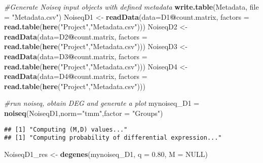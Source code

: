 \documentclass[]{article}
\newenvironment{Shaded}{\begin{snugshade}}{\end{snugshade}}
\newcommand{\CommentTok}[1]{\textcolor[rgb]{0.56,0.35,0.01}{\textit{#1}}}
\newcommand{\DataTypeTok}[1]{\textcolor[rgb]{0.13,0.29,0.53}{#1}}
\newcommand{\FloatTok}[1]{\textcolor[rgb]{0.00,0.00,0.81}{#1}}
\newcommand{\KeywordTok}[1]{\textcolor[rgb]{0.13,0.29,0.53}{\textbf{#1}}}
\newcommand{\NormalTok}[1]{#1}
\newcommand{\OperatorTok}[1]{\textcolor[rgb]{0.81,0.36,0.00}{\textbf{#1}}}
\newcommand{\OtherTok}[1]{\textcolor[rgb]{0.56,0.35,0.01}{#1}}
\newcommand{\StringTok}[1]{\textcolor[rgb]{0.31,0.60,0.02}{#1}}
\begin{document}
\begin{Shaded}
\begin{Highlighting}[]
\CommentTok{#Generate Noiseq input objects with defined metadata}
\KeywordTok{write.table}\NormalTok{(Metadata, }\DataTypeTok{file =} \StringTok{"Metadata.csv"}\NormalTok{)}
\NormalTok{NoiseqD1 <-}\StringTok{ }\KeywordTok{readData}\NormalTok{(}\DataTypeTok{data=}\NormalTok{D1}\OperatorTok{@}\NormalTok{count.matrix, }\DataTypeTok{factors =} \KeywordTok{read.table}\NormalTok{(}\KeywordTok{here}\NormalTok{(}\StringTok{"Project"}\NormalTok{,}\StringTok{"Metadata.csv"}\NormalTok{)))}
\NormalTok{NoiseqD2 <-}\StringTok{ }\KeywordTok{readData}\NormalTok{(}\DataTypeTok{data=}\NormalTok{D2}\OperatorTok{@}\NormalTok{count.matrix, }\DataTypeTok{factors =} \KeywordTok{read.table}\NormalTok{(}\KeywordTok{here}\NormalTok{(}\StringTok{"Project"}\NormalTok{,}\StringTok{"Metadata.csv"}\NormalTok{)))}
\NormalTok{NoiseqD3 <-}\StringTok{ }\KeywordTok{readData}\NormalTok{(}\DataTypeTok{data=}\NormalTok{D3}\OperatorTok{@}\NormalTok{count.matrix, }\DataTypeTok{factors =} \KeywordTok{read.table}\NormalTok{(}\KeywordTok{here}\NormalTok{(}\StringTok{"Project"}\NormalTok{,}\StringTok{"Metadata.csv"}\NormalTok{)))}
\NormalTok{NoiseqD4 <-}\StringTok{ }\KeywordTok{readData}\NormalTok{(}\DataTypeTok{data=}\NormalTok{D4}\OperatorTok{@}\NormalTok{count.matrix, }\DataTypeTok{factors =} \KeywordTok{read.table}\NormalTok{(}\KeywordTok{here}\NormalTok{(}\StringTok{"Project"}\NormalTok{,}\StringTok{"Metadata.csv"}\NormalTok{)))}

\CommentTok{#run noiseq, obtain DEG and generate a plot }
\NormalTok{mynoiseq_D1 =}\StringTok{ }\KeywordTok{noiseq}\NormalTok{(NoiseqD1,}\DataTypeTok{norm=}\StringTok{"tmm"}\NormalTok{,}\DataTypeTok{factor =} \StringTok{"Groups"}\NormalTok{)}
\end{Highlighting}
\end{Shaded}

\begin{verbatim}
## [1] "Computing (M,D) values..."
## [1] "Computing probability of differential expression..."
\end{verbatim}

\begin{Shaded}
\begin{Highlighting}[]
\NormalTok{NoiseqD1_res <-}\StringTok{ }\KeywordTok{degenes}\NormalTok{(mynoiseq_D1, }\DataTypeTok{q =} \FloatTok{0.80}\NormalTok{, }\DataTypeTok{M =} \OtherTok{NULL}\NormalTok{)}
\end{Highlighting}
\end{Shaded}
\end{document}
